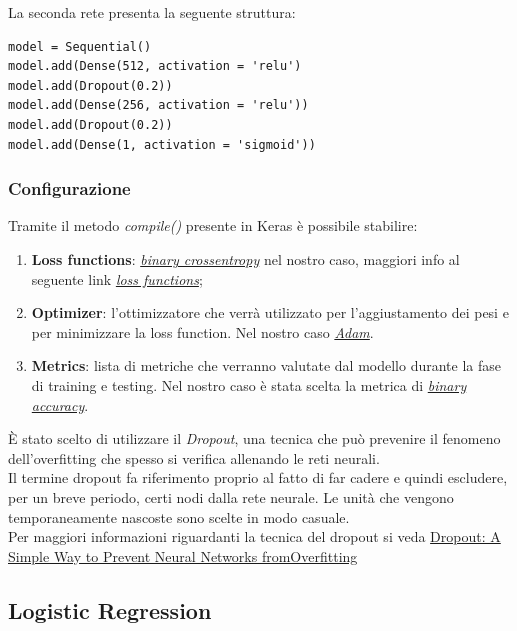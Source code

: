 La seconda rete presenta la seguente struttura:
\begin{lstlisting}[backgroundcolor = \color{white}]
model = Sequential()
model.add(Dense(512, activation = 'relu')
model.add(Dropout(0.2))
model.add(Dense(256, activation = 'relu'))
model.add(Dropout(0.2))
model.add(Dense(1, activation = 'sigmoid'))
\end{lstlisting}


\subsubsection{Configurazione}
Tramite il metodo \textit{compile()} presente in Keras è possibile stabilire:
\begin{enumerate}
	\item \textbf{Loss functions}: \href{https://en.wikipedia.org/wiki/Cross_entropy}{\textit{binary crossentropy}} nel nostro caso, maggiori info al seguente link \href{https://keras.io/losses/}{\textit{loss functions}};
	\item \textbf{Optimizer}: l'ottimizzatore che verrà utilizzato per l'aggiustamento dei pesi e per minimizzare la loss function.
	Nel nostro caso \href{https://arxiv.org/pdf/1412.6980v8.pdf}{\textit{Adam}}. 
	\item \textbf{Metrics}: lista di metriche che verranno valutate dal modello durante la fase di training e testing.
	Nel nostro caso è stata scelta la metrica di \href{https://keras.io/metrics/#binary_accuracy}{\textit{binary accuracy}}.  
\end{enumerate} 
È stato scelto di utilizzare il \textit{Dropout}, una tecnica che può prevenire il fenomeno dell'overfitting che spesso si verifica allenando le reti neurali.\\
Il termine dropout fa riferimento proprio al fatto di far cadere e quindi escludere, per un breve periodo, certi nodi dalla rete neurale. Le unità che vengono temporaneamente nascoste sono scelte in modo casuale.\\
Per maggiori informazioni riguardanti la tecnica del dropout si 
veda \href{http://www.jmlr.org/papers/volume15/srivastava14a/srivastava14a.pdf}{Dropout: A Simple Way to Prevent Neural Networks fromOverfitting}
\subsection{Logistic Regression}


